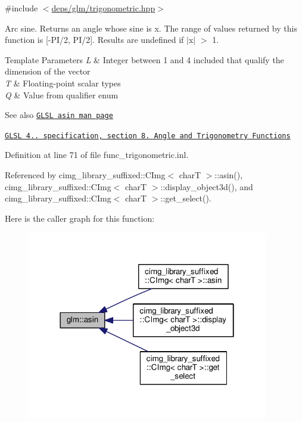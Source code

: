 {\ttfamily \#include $<$\hyperlink{trigonometric_8hpp}{deps/glm/trigonometric.\+hpp}$>$}

Arc sine. Returns an angle whose sine is x. The range of values returned by this function is \mbox{[}-\/\+P\+I/2, P\+I/2\mbox{]}. Results are undefined if $\vert$x$\vert$ $>$ 1.


\begin{DoxyTemplParams}{Template Parameters}
{\em L} & Integer between 1 and 4 included that qualify the dimension of the vector \\
\hline
{\em T} & Floating-\/point scalar types \\
\hline
{\em Q} & Value from qualifier enum\\
\hline
\end{DoxyTemplParams}
\begin{DoxySeeAlso}{See also}
\href{http://www.opengl.org/sdk/docs/manglsl/xhtml/asin.xml}{\tt G\+L\+SL asin man page} 

\href{http://www.opengl.org/registry/doc/GLSLangSpec.4.20.8.pdf}{\tt G\+L\+SL 4.. specification, section 8. Angle and Trigonometry Functions} 
\end{DoxySeeAlso}


Definition at line 71 of file func\+\_\+trigonometric.\+inl.



Referenced by cimg\+\_\+library\+\_\+suffixed\+::\+C\+Img$<$ char\+T $>$\+::asin(), cimg\+\_\+library\+\_\+suffixed\+::\+C\+Img$<$ char\+T $>$\+::display\+\_\+object3d(), and cimg\+\_\+library\+\_\+suffixed\+::\+C\+Img$<$ char\+T $>$\+::get\+\_\+select().

Here is the caller graph for this function\+:
\nopagebreak
\begin{figure}[H]
\begin{center}
\leavevmode
\includegraphics[width=298pt]{dc/d43/group__core__func__trigonometric_ga0552d2df4865fa8c3d7cfc3ec2caac73_icgraph}
\end{center}
\end{figure}
\mbox{\label{group__core__func__trigonometric_ga3ef16b501ee859fddde88e22192a5950}} 
